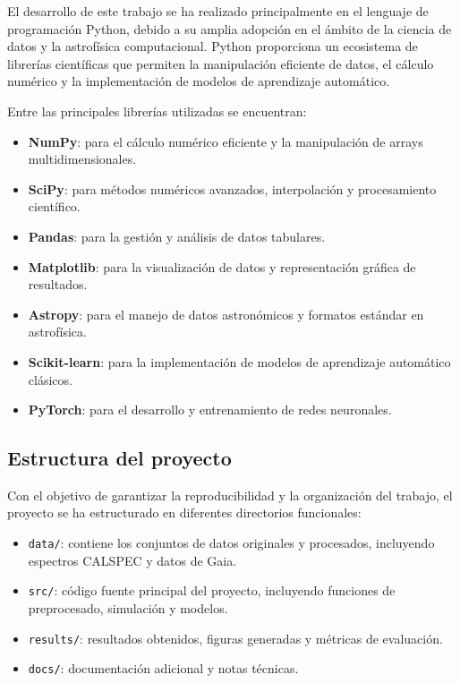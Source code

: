 \documentclass{article}
\begin{document}
El desarrollo de este trabajo se ha realizado principalmente en el lenguaje de programación Python, debido a su amplia adopción en el ámbito de la ciencia de datos y la astrofísica computacional. Python proporciona un ecosistema de librerías científicas que permiten la manipulación eficiente de datos, el cálculo numérico y la implementación de modelos de aprendizaje automático.

Entre las principales librerías utilizadas se encuentran:

\begin{itemize}
    \item \textbf{NumPy}: para el cálculo numérico eficiente y la manipulación de arrays multidimensionales.
    \item \textbf{SciPy}: para métodos numéricos avanzados, interpolación y procesamiento científico.
    \item \textbf{Pandas}: para la gestión y análisis de datos tabulares.
    \item \textbf{Matplotlib}: para la visualización de datos y representación gráfica de resultados.
    \item \textbf{Astropy}: para el manejo de datos astronómicos y formatos estándar en astrofísica.
    \item \textbf{Scikit-learn}: para la implementación de modelos de aprendizaje automático clásicos.
    \item \textbf{PyTorch}: para el desarrollo y entrenamiento de redes neuronales.
\end{itemize}

\subsection{Estructura del proyecto}

Con el objetivo de garantizar la reproducibilidad y la organización del trabajo, el proyecto se ha estructurado en diferentes directorios funcionales:

\begin{itemize}
    \item \texttt{data/}: contiene los conjuntos de datos originales y procesados, incluyendo espectros CALSPEC y datos de Gaia.
    \item \texttt{src/}: código fuente principal del proyecto, incluyendo funciones de preprocesado, simulación y modelos.
    \item \texttt{results/}: resultados obtenidos, figuras generadas y métricas de evaluación.
    \item \texttt{docs/}: documentación adicional y notas técnicas.
\end{itemize}
\end{document}

